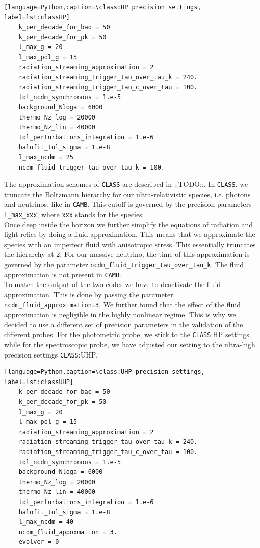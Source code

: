 \documentclass[oneside]{book}
\newcommand*{\marktodo}{{\color{mmcol} ::TODO::}\xspace}
\newcommand*{\class}{{\tt CLASS}\xspace}
\newcommand*{\camb}{{\tt CAMB}\xspace}
\begin{document}
\begin{lstlisting}[language=Python,caption=\class:HP precision settings, label=lst:classHP]
    k_per_decade_for_bao = 50
    k_per_decade_for_pk = 50
    l_max_g = 20
    l_max_pol_g = 15
    radiation_streaming_approximation = 2
    radiation_streaming_trigger_tau_over_tau_k = 240.
    radiation_streaming_trigger_tau_c_over_tau = 100.
    tol_ncdm_synchronous = 1.e-5
    background_Nloga = 6000
    thermo_Nz_log = 20000
    thermo_Nz_lin = 40000
    tol_perturbations_integration = 1.e-6
    halofit_tol_sigma = 1.e-8
    l_max_ncdm = 25
    ncdm_fluid_trigger_tau_over_tau_k = 100.
\end{lstlisting} 
 The approximation schemes of \class are described in \marktodo. In \class, we truncate the Boltzmann hierarchy for our ultra-relativistic species, i.e. photons and neutrinos, like in \camb. This cutoff is governed by the precision parameters {\tt l\_max\_xxx}, where {\tt xxx} stands for the species.\\
 Once deep inside the horizon we further simplify the equations of radiation and light relics by doing a fluid approximation. This means that we approximate the species with an imperfect fluid with anisotropic stress. This essentially truncates the hierarchy at 2. For our massive neutrino, the time of this approximation is governed by the parameter {\tt ncdm\_fluid\_trigger\_tau\_over\_tau\_k}.
 The fluid approximation is not present in \camb.\\
  To match the output of the two codes we have to deactivate the fluid approximation. This is done by passing the parameter {\tt ncdm\_fluid\_approximation=3}. We further found that the effect of the fluid approximation is negligible in the highly nonlinear regime. This is why we decided to use a different set of precision parameters in the validation of the different probes. For the photometric probe, we stick to the \class:HP settings while for the spectroscopic probe, we have adjusted our setting to the ultra-high precision settings \class:UHP.
 \begin{lstlisting}[language=Python,caption=\class:UHP precision settings, label=lst:classUHP]
    k_per_decade_for_bao = 50
    k_per_decade_for_pk = 50
    l_max_g = 20
    l_max_pol_g = 15
    radiation_streaming_approximation = 2
    radiation_streaming_trigger_tau_over_tau_k = 240.
    radiation_streaming_trigger_tau_c_over_tau = 100.
    tol_ncdm_synchronous = 1.e-5
    background_Nloga = 6000
    thermo_Nz_log = 20000
    thermo_Nz_lin = 40000
    tol_perturbations_integration = 1.e-6
    halofit_tol_sigma = 1.e-8
    l_max_ncdm = 40
    ncdm_fluid_appoxmation = 3.
    evolver = 0
 \end{lstlisting}
\end{document}
